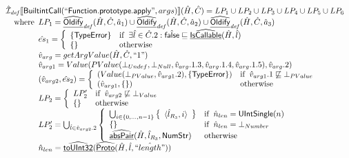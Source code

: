 \[\begin{array}{l}
\hat{\mathcal{I}}_{\it def}\llbracket \mbox{\textsf{BuiltintCall}}(``\mbox{\textsf{Function.prototype.apply}}",args)\rrbracket(\hat{H},\hat{C}) = LP_1 \cup LP_2 \cup LP_3 \cup LP_4 \cup LP_5 \cup LP_6\\
\quad{\rm where}\begin{array}[t]{l}
  LP_1 = \widehat{\underline{\sf Oldify}}_{\it def}(\hat{H}, \hat{C}, \hat{a}_1) \cup \widehat{\underline{\sf Oldify}}_{\it def}(\hat{H}, \hat{C}, \hat{a}_2) \cup \widehat{\underline{\sf Oldify}}_{\it def}(\hat{H}, \hat{C}, \hat{a}_3)\\
  \hat{es}_1 = \left\{\begin{array}{ll}
      \{ \mbox{\textsf{TypeError}} \}
      & {\rm if}\begin{array}[t]{l}\exists\hat{l}\in\hat{C}.2: \hat{\mbox{\textsf{false}}} \sqsubseteq \widehat{\underline{\sf IsCallable}}(\hat{H}, \hat{l})\end{array}\\
      \left\{\begin{array}{l}\end{array}\right\} & {\rm otherwise}
    \end{array}\right.\\
  \hat{v}_{arg} = getArgValue(\hat{H}, \hat{C}, ``1")\\
  \hat{v}_{arg1} = Value(PValue(\bot_{Undef}, \bot_{Null}, \hat{v}_{arg}.1.3, \hat{v}_{arg}.1.4, \hat{v}_{arg}.1.5), \hat{v}_{arg}.2)\\
  (\hat{v}_{arg2}, \hat{es}_2) = \left\{\begin{array}{ll}
      (Value(\bot_{PValue}, \hat{v}_{arg1}.2), \{ \mbox{\textsf{TypeError}} \})
      & {\rm if}\begin{array}[t]{l}\hat{v}_{arg1}.1 \not\sqsubseteq \bot_{PValue}\end{array}\\
      (\hat{v}_{arg1}, \left\{\begin{array}{l}\end{array}\right\}) & {\rm otherwise}
    \end{array}\right.\\
  LP_2 =  \left\{\begin{array}{ll}
      LP_2'
      & {\rm if}\begin{array}[t]{l}\hat{v}_{arg2} \not\sqsubseteq \bot_{Value}\end{array}\\
      \left\{\begin{array}{l}\end{array}\right\} & {\rm otherwise}
    \end{array}\right.\\
  LP_2' =  \bigcup_{\hat{l} \in \hat{v}_{arg2}.2} \left\{\begin{array}{ll}
      \bigcup_{i \in \{0,...,n-1\}} \left\{\begin{array}{l}\langle \hat{l}_{R_3}, i\rangle\end{array}\right\}
      & {\rm if}\begin{array}[t]{l}\hat{n}_{len} = \mbox{\textsf{UIntSingle}}(n)\end{array}\\
      \left\{\begin{array}{l}\end{array}\right\} & {\rm if}\begin{array}[t]{l}\hat{n}_{len} = \bot_{Number}\end{array}\\
       \widehat{\underline{\sf absPair}}(\hat{H}, \hat{l}_{R_3}, \mbox{\textsf{NumStr}}) & {\rm otherwise}\\
    \end{array}\right.\\
  \hat{n}_{len} = \widehat{\underline{\sf toUInt32}}(\widehat{\underline{\sf Proto}}(\hat{H}, \hat{l}, \hat{``length"}))\\
  
\end{array}
\end{array}\]
